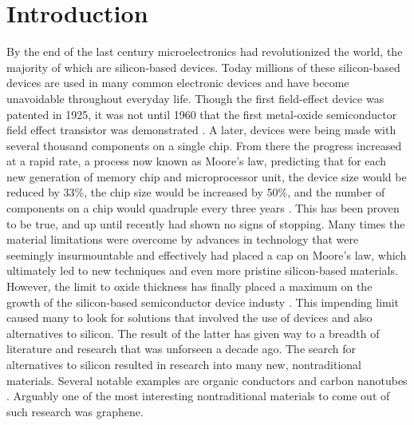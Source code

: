\documentclass[%
 reprint,
 amsmath,amssymb,
 aps,
pra,
floatfix,
]{revtex4-1}
\begin{document}
\section{\label{sec:introduction} Introduction}
By the end of the last century microelectronics had revolutionized the world, the majority of which are silicon-based devices. Today millions of these silicon-based devices are used in many common electronic devices and have become unavoidable throughout everyday life. Though the first field-effect device was patented in 1925, it was not until 1960 that the first metal-oxide semiconductor field effect transistor was demonstrated \cite{Lilienfeld1925, Atalla1960, Schulz1999}. A later, devices were being made with several thousand components on a single chip. From there the progress increased at a rapid rate, a process now known as Moore's law, predicting that for each new generation of memory chip and microprocessor unit, the device size would be reduced by 33\%, the chip size would be increased by 50\%, and the number of components on a chip would quadruple every three years \cite{Schulz1999, Moore1965}. This has been proven to be true, and up until recently had shown no signs of stopping. Many times the material limitations were overcome by advances in technology that were seemingly insurmountable and effectively had placed a cap on Moore's law, which ultimately led to new techniques and even more pristine silicon-based materials. However, the limit to oxide thickness has finally placed a maximum on the growth of the silicon-based semiconductor device industy \cite{Schulz1999}. This impending limit caused many to look for solutions that involved the use of  devices and also alternatives to silicon. The result of the latter has given way to a breadth of literature and research that was unforseen a decade ago. The search for alternatives to silicon resulted in research into many new, nontraditional materials. Several notable examples are organic conductors and carbon nanotubes \cite{Mascaro2001, Baughman2002}. Arguably one of the most interesting nontraditional materials to come out of such research was graphene.  
\end{document}
